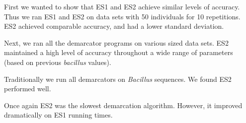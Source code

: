 First we wanted to show that ES1 and ES2 achieve similar levels of accuracy.
Thus we ran ES1 and ES2 on data sets with 50 individuals for 10 repetitions.
ES2 achieved comparable accuracy, and had a lower standard deviation.

Next, we ran all the demarcator programs on various sized data sets.
ES2 maintained a high level of accuracy throughout a wide range of parameters (based on previous \emph{bacillus} values).

Traditionally we run all demarcators on \emph{Bacillus} sequences.
We found ES2 performed well.

Once again ES2 was the slowest demarcation algorithm.
However, it improved dramatically on ES1 running times.


